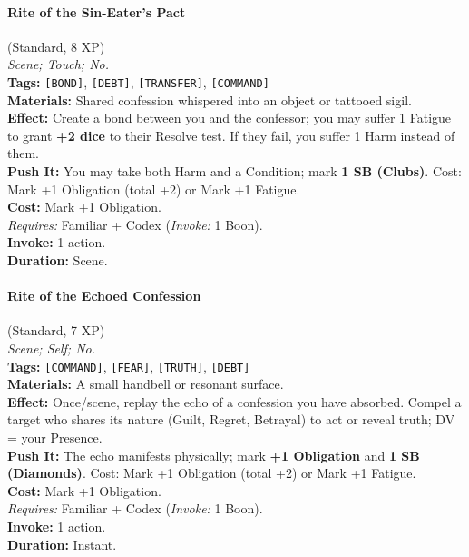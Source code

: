 \paragraph{Rite of the Sin-Eater's Pact} (Standard, 8 XP) \hfill \\
\emph{Scene; Touch; No.} \\
\textbf{Tags:} \texttt{[BOND]}, \texttt{[DEBT]}, \texttt{[TRANSFER]}, \texttt{[COMMAND]} \\
\textbf{Materials:} Shared confession whispered into an object or tattooed sigil. \\
\textbf{Effect:} Create a bond between you and the confessor; you may suffer 1 Fatigue to grant \textbf{+2 dice} to their Resolve test. If they fail, you suffer 1 Harm instead of them. \\
\textbf{Push It:} You may take both Harm and a Condition; mark \textbf{1 SB (Clubs)}. Cost: Mark +1 Obligation (total +2) or Mark +1 Fatigue. \\
\textbf{Cost:} Mark +1 Obligation. \\
\textit{Requires:} Familiar + Codex (\textit{Invoke:} 1 Boon). \\
\textbf{Invoke:} 1 action. \\
\textbf{Duration:} Scene.

\paragraph{Rite of the Echoed Confession} (Standard, 7 XP) \hfill \\
\emph{Scene; Self; No.} \\
\textbf{Tags:} \texttt{[COMMAND]}, \texttt{[FEAR]}, \texttt{[TRUTH]}, \texttt{[DEBT]} \\
\textbf{Materials:} A small handbell or resonant surface. \\
\textbf{Effect:} Once/scene, replay the echo of a confession you have absorbed. Compel a target who shares its nature (Guilt, Regret, Betrayal) to act or reveal truth; DV = your Presence. \\
\textbf{Push It:} The echo manifests physically; mark \textbf{+1 Obligation} and \textbf{1 SB (Diamonds)}. Cost: Mark +1 Obligation (total +2) or Mark +1 Fatigue. \\
\textbf{Cost:} Mark +1 Obligation. \\
\textit{Requires:} Familiar + Codex (\textit{Invoke:} 1 Boon). \\
\textbf{Invoke:} 1 action. \\
\textbf{Duration:} Instant.

